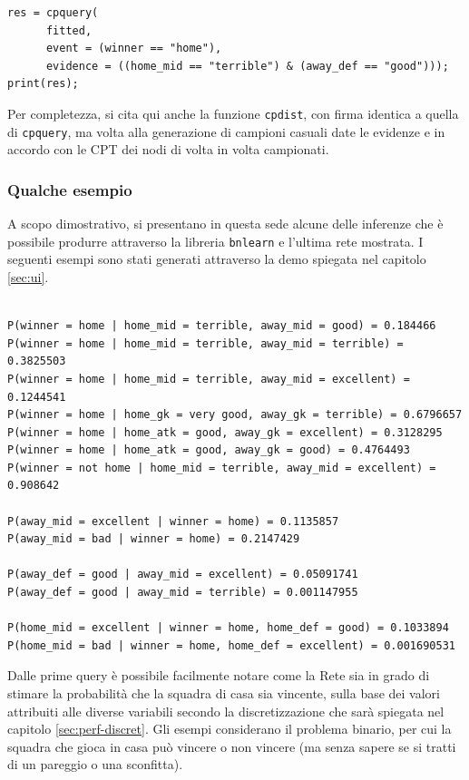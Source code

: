 \documentclass[hidelinks, 12pt]{article}
\begin{document}
\begin{verbatim}
res = cpquery(
      fitted,
      event = (winner == "home"),
      evidence = ((home_mid == "terrible") & (away_def == "good")));
print(res);
\end{verbatim}

\vspace{2ex}

Per completezza, si cita qui anche la funzione \texttt{cpdist}, con firma identica a quella di \texttt{cpquery}, ma volta alla generazione di campioni casuali date le evidenze e in accordo con le CPT dei nodi di volta in volta campionati.


\subsubsection{Qualche esempio}
\label{sec:inference-examples}

A scopo dimostrativo, si presentano in questa sede alcune delle inferenze che è possibile produrre attraverso la libreria \texttt{bnlearn} e l'ultima rete mostrata. I seguenti esempi sono stati generati attraverso la demo spiegata nel capitolo \ref{sec:ui}.

\begin{verbatim}

P(winner = home | home_mid = terrible, away_mid = good) = 0.184466
P(winner = home | home_mid = terrible, away_mid = terrible) = 0.3825503
P(winner = home | home_mid = terrible, away_mid = excellent) = 0.1244541
P(winner = home | home_gk = very good, away_gk = terrible) = 0.6796657
P(winner = home | home_atk = good, away_gk = excellent) = 0.3128295
P(winner = home | home_atk = good, away_gk = good) = 0.4764493
P(winner = not home | home_mid = terrible, away_mid = excellent) = 0.908642

P(away_mid = excellent | winner = home) = 0.1135857
P(away_mid = bad | winner = home) = 0.2147429

P(away_def = good | away_mid = excellent) = 0.05091741
P(away_def = good | away_mid = terrible) = 0.001147955

P(home_mid = excellent | winner = home, home_def = good) = 0.1033894
P(home_mid = bad | winner = home, home_def = excellent) = 0.001690531

\end{verbatim}

Dalle prime query è possibile facilmente notare come la Rete sia in grado di stimare la probabilità che la squadra di casa sia vincente, sulla base dei valori attribuiti alle diverse variabili secondo la discretizzazione che sarà spiegata nel capitolo \ref{sec:perf-discret}. Gli esempi considerano il problema binario, per cui la squadra che gioca in casa può vincere o non vincere (ma senza sapere se si tratti di un pareggio o una sconfitta).
\end{document}
